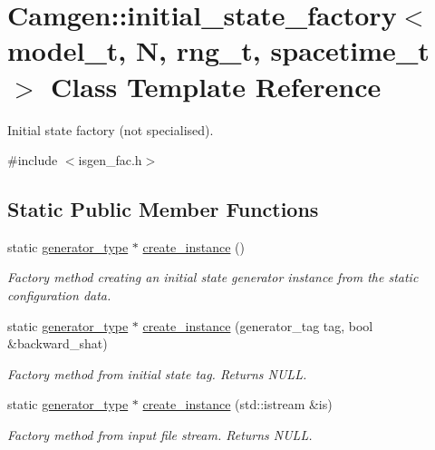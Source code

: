 \hypertarget{a00305}{\section{Camgen\-:\-:initial\-\_\-state\-\_\-factory$<$ model\-\_\-t, N, rng\-\_\-t, spacetime\-\_\-t $>$ Class Template Reference}
\label{a00305}
}


Initial state factory (not specialised).  




{\ttfamily \#include $<$isgen\-\_\-fac.\-h$>$}

\subsection*{Static Public Member Functions}
\begin{DoxyCompactItemize}
\item 
static \hyperlink{a00304}{generator\-\_\-type} $\ast$ \hyperlink{a00305_ab04aebb8d2eb7986ee65701ab225667c}{create\-\_\-instance} ()
\begin{DoxyCompactList}\small\item\em Factory method creating an initial state generator instance from the static configuration data. \end{DoxyCompactList}\item 
\hypertarget{a00305_a82814f4c2b1cdb6ee14c1d07a2720bab}{static \hyperlink{a00304}{generator\-\_\-type} $\ast$ \hyperlink{a00305_a82814f4c2b1cdb6ee14c1d07a2720bab}{create\-\_\-instance} (generator\-\_\-tag tag, bool \&backward\-\_\-shat)}\label{a00305_a82814f4c2b1cdb6ee14c1d07a2720bab}

\begin{DoxyCompactList}\small\item\em Factory method from initial state tag. Returns N\-U\-L\-L. \end{DoxyCompactList}\item 
\hypertarget{a00305_a41cc1142ccd1178763b40b1666b6b604}{static \hyperlink{a00304}{generator\-\_\-type} $\ast$ \hyperlink{a00305_a41cc1142ccd1178763b40b1666b6b604}{create\-\_\-instance} (std\-::istream \&is)}\label{a00305_a41cc1142ccd1178763b40b1666b6b604}

\begin{DoxyCompactList}\small\item\em Factory method from input file stream. Returns N\-U\-L\-L. \end{DoxyCompactList}\end{DoxyCompactItemize}


